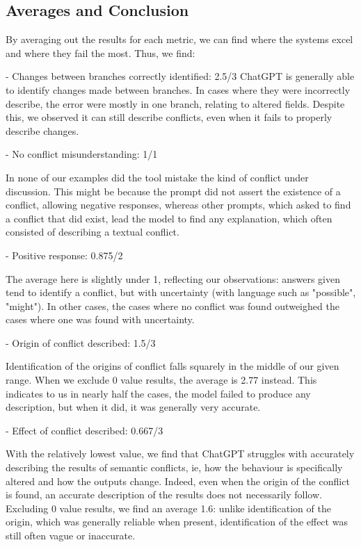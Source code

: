 \subsection{Averages and Conclusion}

By averaging out the results for each metric, we can find where the systems excel and where they fail the most. Thus, we find:

- Changes between branches correctly identified: 2.5/3
ChatGPT is generally able to identify changes made between branches. In cases where they were incorrectly describe, the error were mostly in one branch, relating to altered fields. Despite this, we observed it can still describe conflicts, even when it fails to properly describe changes.

- No conflict misunderstanding: 1/1

In none of our examples did the tool mistake the kind of conflict under discussion. This might be because the prompt did not assert the existence of a conflict, allowing negative responses, whereas other prompts, which asked to find a conflict that did exist, lead the model to find any explanation, which often consisted of describing a textual conflict.

- Positive response: 0.875/2

The average here is slightly under 1, reflecting our observations: answers given tend to identify a conflict, but with uncertainty (with language such as "possible", "might"). In other cases, the cases where no conflict was found outweighed the cases where one was found with uncertainty.

- Origin of conflict described: 1.5/3

Identification of the origins of conflict falls squarely in the middle of our given range.  When we exclude 0 value results, the average is 2.77 instead. This indicates to us in nearly half the cases, the model failed to produce any description, but when it did, it was generally very accurate.

- Effect of conflict described: 0.667/3

With the relatively lowest value, we find that ChatGPT struggles with accurately describing the results of semantic conflicts, ie, how the behaviour is specifically altered and how the outputs change. Indeed, even when the origin of the conflict is found, an accurate description of the results does not necessarily follow. Excluding 0 value results, we find an average 1.6: unlike identification of the origin, which was generally reliable when present, identification of the effect was still often vague or inaccurate.


